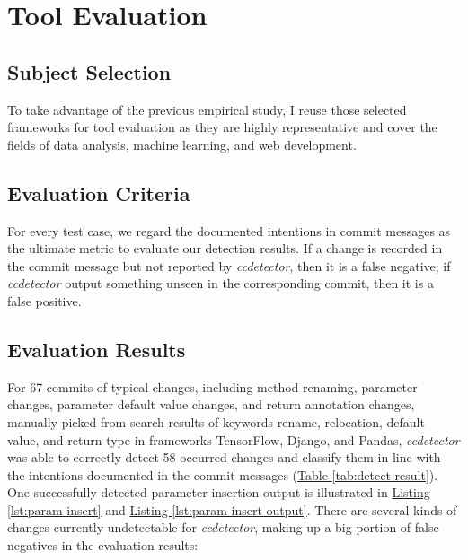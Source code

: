 \chapter{Tool Evaluation}
\label{chap:tool-evaluation}

\section{Subject Selection}

To take advantage of the previous empirical study, I reuse those selected frameworks for tool evaluation as they are highly representative and cover the fields of data analysis, machine learning, and web development.

\section{Evaluation Criteria}

For every test case, we regard the documented intentions in commit messages as the ultimate metric to evaluate our detection results. If a change is recorded in the commit message but not reported by \textit{ccdetector}, then it is a false negative; if \textit{ccdetector} output something unseen in the corresponding commit, then it is a false positive.

\section{Evaluation Results}

For 67 commits of typical changes, including method renaming, parameter changes, parameter default value changes, and return annotation changes, manually picked from search results of keywords {\mycode rename}, {\mycode relocation}, {\mycode default value}, and {\mycode return type} in frameworks TensorFlow, Django, and Pandas, \textit{ccdetector} was able to correctly detect 58 occurred changes and classify them in line with the intentions documented in the commit messages (\hyperref[tab:detect-result]{Table \ref*{tab:detect-result}}). One successfully detected parameter insertion output is illustrated in \hyperref[lst:param-insert]{Listing \ref*{lst:param-insert}} and \hyperref[lst:param-insert-output]{Listing \ref*{lst:param-insert-output}}. There are several kinds of changes currently undetectable for \textit{ccdetector}, making up a big portion of false negatives in the evaluation results:

